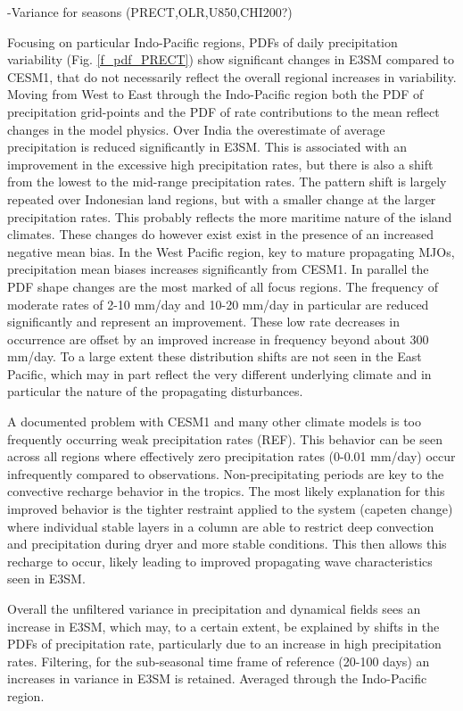 \documentclass[draft,ms]{AGUTeX}
\begin{document}
\begin{article}
-Variance for seasons (PRECT,OLR,U850,CHI200?)

Focusing on particular Indo-Pacific regions, PDFs of daily precipitation variability (Fig. \ref{f_pdf_PRECT}) show significant changes in E3SM compared to CESM1, that do not necessarily reflect the overall regional increases in variability. Moving from West to East through the Indo-Pacific region both the PDF of precipitation grid-points and the PDF of rate contributions to the mean reflect changes in the model physics. Over India the overestimate of average precipitation is reduced significantly in E3SM. This is associated with an improvement in the excessive high precipitation rates, but there is also a shift from the lowest to the mid-range precipitation rates. The pattern shift is largely repeated over Indonesian land regions, but with a smaller change at the larger precipitation rates. This probably reflects the more maritime nature of the island climates. These changes do however exist exist in the presence of an increased negative mean bias. In the West Pacific region, key to mature propagating MJOs, precipitation mean biases increases significantly from CESM1. In parallel the PDF shape changes are the most marked of all focus regions. The frequency of moderate rates of 2-10 mm/day and 10-20 mm/day in particular are reduced significantly and represent an improvement. These low rate decreases in occurrence are offset by an improved increase in frequency beyond about 300 mm/day. To a large extent these distribution shifts are not seen in the East Pacific, which may in part reflect the very different underlying climate and in particular the nature of the propagating disturbances.

A documented problem with CESM1 and many other climate models is too frequently occurring weak precipitation rates (REF). This behavior can be seen across all regions where effectively zero precipitation rates (0-0.01 mm/day) occur infrequently compared to observations. Non-precipitating periods are key to the convective recharge behavior in the tropics. The most likely explanation for this improved behavior is the tighter restraint applied to the system (capeten change) where individual stable layers in a column are able to restrict deep convection and precipitation during dryer and more stable conditions. This then allows this recharge to occur, likely leading to improved propagating wave characteristics seen in E3SM.

Overall the unfiltered variance in precipitation and dynamical fields sees an increase in E3SM, which may, to a certain extent, be explained by shifts in the PDFs of precipitation rate, particularly due to an increase in high precipitation rates. Filtering, for the sub-seasonal time frame of reference (20-100 days) an increases in variance in E3SM is retained. Averaged through the Indo-Pacific region.



\end{article}
\end{document}
